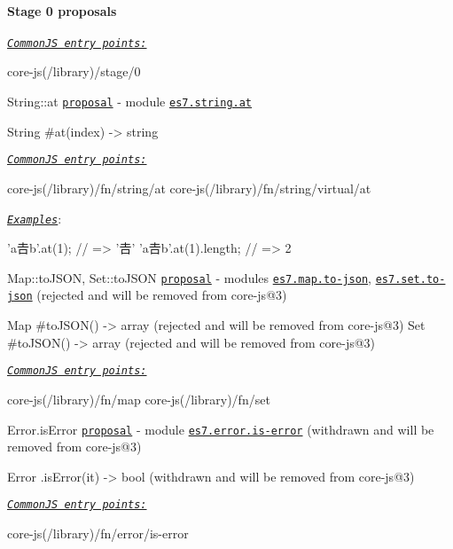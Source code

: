 \paragraph*{Stage 0 proposals}

\href{#commonjs}{\tt {\itshape Common\+JS entry points\+:}} 
\begin{DoxyCode}
core-js(/library)/stage/0
\end{DoxyCode}

\begin{DoxyItemize}
\item {\ttfamily String\+::at} \href{https://github.com/mathiasbynens/String.prototype.at}{\tt proposal} -\/ module \href{https://github.com/zloirock/core-js/blob/v2.6.0/modules/es7.string.at.js}{\tt {\ttfamily es7.\+string.\+at}} 
\begin{DoxyCode}
String
  #at(index) -> string
\end{DoxyCode}
 \href{#commonjs}{\tt {\itshape Common\+JS entry points\+:}} 
\begin{DoxyCode}
core-js(/library)/fn/string/at
core-js(/library)/fn/string/virtual/at
\end{DoxyCode}
 \href{http://goo.gl/XluXI8}{\tt {\itshape Examples}}\+: 
\begin{DoxyCode}
'a𠮷b'.at(1);        // => '𠮷'
'a𠮷b'.at(1).length; // => 2
\end{DoxyCode}

\item {\ttfamily Map\+::to\+J\+S\+ON}, {\ttfamily Set\+::to\+J\+S\+ON} \href{https://github.com/DavidBruant/Map-Set.prototype.toJSON}{\tt proposal} -\/ modules \href{https://github.com/zloirock/core-js/blob/v2.6.0/modules/es7.map.to-json.js}{\tt {\ttfamily es7.\+map.\+to-\/json}}, \href{https://github.com/zloirock/core-js/blob/v2.6.0/modules/es7.set.to-json.js}{\tt {\ttfamily es7.\+set.\+to-\/json}} (rejected and will be removed from {\ttfamily core-\/js@3}) 
\begin{DoxyCode}
Map
  #toJSON() -> array (rejected and will be removed from core-js@3)
Set
  #toJSON() -> array (rejected and will be removed from core-js@3)
\end{DoxyCode}
 \href{#commonjs}{\tt {\itshape Common\+JS entry points\+:}} 
\begin{DoxyCode}
core-js(/library)/fn/map
core-js(/library)/fn/set
\end{DoxyCode}

\item {\ttfamily Error.\+is\+Error} \href{https://github.com/ljharb/proposal-is-error}{\tt proposal} -\/ module \href{https://github.com/zloirock/core-js/blob/v2.6.0/modules/es7.error.is-error.js}{\tt {\ttfamily es7.\+error.\+is-\/error}} (withdrawn and will be removed from {\ttfamily core-\/js@3}) 
\begin{DoxyCode}
Error
  .isError(it) -> bool (withdrawn and will be removed from core-js@3)
\end{DoxyCode}
 \href{#commonjs}{\tt {\itshape Common\+JS entry points\+:}} 
\begin{DoxyCode}
core-js(/library)/fn/error/is-error
\end{DoxyCode}


\end{DoxyItemize}
